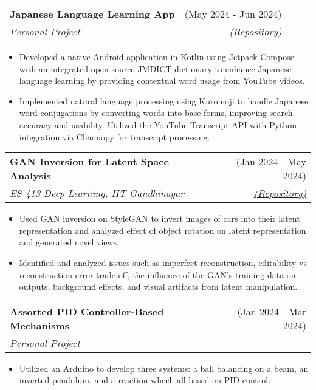 \documentclass[a4paper,10pt]{report}
\makeatletter
\newcommand{\resumeSubheading}[4]{
  \vspace{-1pt}\item
    \begin{tabular*}{0.97\textwidth}[t]{l@{\extracolsep{\fill}}r}
      \textbf{#1} & #2 \\
      \textit{\small#3} & \textit{\small #4} \\
    \end{tabular*}\vspace{-6pt}
}
\makeatother
\begin{document}
\vspace{-6pt}

    \resumeSubheading
      {Japanese Language Learning App}{(May 2024 - Jun 2024)}{Personal Project}
      {\textcolor{lightblue}{\href{https://github.com/Utkarsh-Mishra444/Immerse}{(Repository)}}}{}
       \begin{itemize}
        \item Developed a native Android application in Kotlin using Jetpack Compose with an integrated open-source JMDICT dictionary to enhance Japanese language learning by providing contextual word usage from YouTube videos. \\
        \vspace{-2pt}
        \item Implemented natural language processing using Kuromoji to handle Japanese word conjugations by converting words into base forms, improving search accuracy and usability. Utilized the YouTube Transcript API with Python integration via Chaquopy for transcript processing.
     \end{itemize}


\vspace{-6pt}

    \resumeSubheading
      {GAN Inversion for Latent Space Analysis}{(Jan 2024 - May 2024)}{ES 413 Deep Learning, IIT Gandhinagar}
      {\textcolor{lightblue}{\href{https://github.com/Utkarsh-Mishra444/Gan-Inversion}{(Repository)}}}{}
       \begin{itemize}
        \item Used GAN inversion on StyleGAN to invert images of cars into their latent representation and analyzed effect of object rotation on latent representation and generated novel views. 
        \vspace{-2pt}
        \item Identified and analyzed issues such as imperfect reconstruction, editability vs reconstruction error trade-off, the influence of the GAN's training data on outputs, background effects, and visual artifacts from latent manipulation.
     \end{itemize}


\vspace{-6pt}

    \resumeSubheading
      {Assorted PID Controller-Based Mechanisms}{(Jan 2024 - Mar 2024)}{Personal Project}
      {}{}
       \begin{itemize}
        \item Utilized an Arduino to develop three systems: a ball balancing on a beam, an inverted pendulum, and a reaction wheel, all based on PID control.
        \vspace{-2pt}

     \end{itemize}
\end{document}
